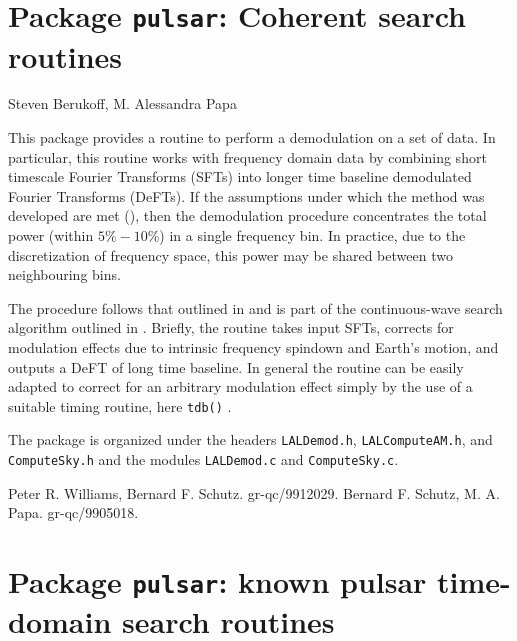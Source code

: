 \chapter{Package \texttt{pulsar}: Coherent search routines}
Steven Berukoff, M. Alessandra Papa
\bigskip

This package provides a routine to perform a demodulation on a set of data.
In particular, this routine works with frequency domain data by combining
short timescale Fourier Transforms (SFTs) into longer time baseline
demodulated Fourier Transforms (DeFTs). If the assumptions under which the
method was developed are met (\cite{Williams:1999}), then the demodulation
procedure concentrates the total power (within $5\%-10\%$) in a single
frequency bin. In practice, due to the discretization of frequency space, this
power may be shared between two neighbouring bins.

The procedure follows that outlined in \cite{Williams:1999} and is part of the
continuous-wave search algorithm outlined in \cite{Schutz:1999}.  Briefly, the
routine takes input SFTs, corrects for modulation effects due to intrinsic
frequency spindown and Earth's motion, and outputs a DeFT of long time
baseline. In general the routine can be easily adapted to correct for an
arbitrary modulation effect simply by the use of a suitable timing routine,
here \verb+tdb()+ .

The package is organized under the headers \verb+LALDemod.h+, \verb+LALComputeAM.h+, and
\verb+ComputeSky.h+ and the modules \verb+LALDemod.c+ and \verb+ComputeSky.c+.


\newpage
\newpage
\newpage
\newpage

\newpage\begin{thebibliography}{0}
        Peter R. Williams, Bernard F. Schutz.  gr-qc/9912029.
        Bernard F. Schutz, M. A. Papa.  gr-qc/9905018. 
\end{thebibliography}

\chapter{Package \texttt{pulsar}: known pulsar time-domain search routines}

